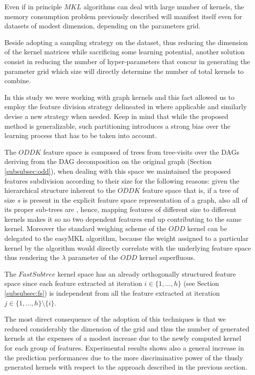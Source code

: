 Even if in principle $MKL$ algorithms can deal with large number of kernels, the
memory consumption problem previously described will manifest itself even for
datasets of modest dimension, depending on the parameters grid.

Beside adopting a sampling strategy on the dataset, thus reducing the dimension
of the kernel matrices while sacrificing some learning potential, another
solution consist in reducing the number of hyper-parameters that concur
in generating the parameter grid which size will directly determine the number
of total kernels to combine.

In this study we were working with graph kernels and this fact allowed us to employ
the feature division strategy delineated in \cite{gmkl} where applicable and similarly
devise a new strategy when needed.
Keep in mind that while the proposed method is generalizable, such partitioning
introduces a strong bias over the learning process that has to be taken into account.

The $ODDK$ feature space is composed of trees from tree-visits
over the DAGs deriving from the DAG decomposition on the original graph (Section \ref{subsubsec:odd}),
when dealing with this space we maintained the proposed features subdivision
according to their size for the following reasons:
given the hierarchical structure inherent to the $ODDK$ feature space that is, if a tree
of size $s$ is present in the explicit feature space representation of a graph,
also all of its proper sub-trees are \cite{gmkl},
hence, mapping features of different size to different kernels makes it so no two
dependent features end up contributing to the same kernel.
Moreover the standard weighing scheme of the $ODD$ kernel can be delegated to
the easyMKL algorithm, because the weight assigned to a
particular kernel by the algorithm would directly correlate with the underlying
feature space thus rendering the $\lambda$ parameter of the $ODD$ kernel superfluous.

The $Fast Subtree$ kernel space has an already orthogonally structured feature
space since each feature extracted at iteration $i \in \{1,\dots,h\}$ (see Section \ref{subsubsec:fs})
is independent from all the feature extracted at iteration $j \in \{1,\dots,h\}\setminus \{i\}$.

The most direct consequence of the adoption of this techniques is that we reduced
considerably the dimension of the grid and thus the number of generated kernels at
the expenses of a modest increase due to the newly computed kernel for each group
of features.
Experimental results shows also a general increase in the prediction performances
due to the more discriminative power of the thusly generated kernels with respect
to the approach described in the previous section.

